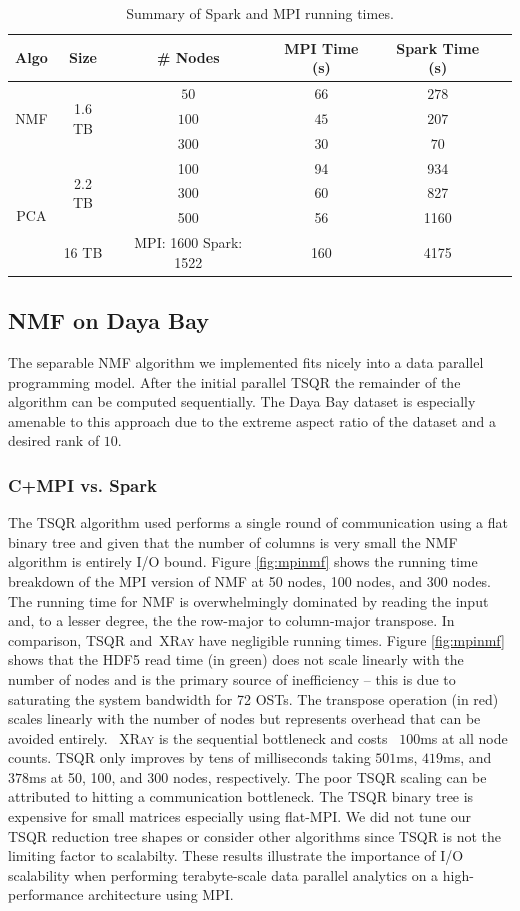 \begin{table}[t]
\centering

\begin{tabular}{|c|c|c|c|c|c|} \hline
Algo & Size & \# Nodes & MPI Time (s) & Spark Time (s)\\ \hline
\multirow{3}{*}{NMF} & \multirow{3}{*}{1.6 TB} & $50$ & $66$ & $278$\\
{} & {} & $100$  & $45$ & $207$\\
{} & {} & $300$ & $30$ & $70$\\ \hline
\multirow{4}{*}{PCA} & \multirow{3}{*}{2.2 TB} & 100 & 94 & 934\\
 {} & {} & 300 & 60 & 827\\
 {} & {} & 500 & 56 & 1160\\ \cline{2-5}
 {} & {16 TB} & {MPI: 1600 Spark: 1522} & 160 & 4175 \\ \hline
\end{tabular}
\caption{{Summary of Spark and MPI running times.}}
\label{tab:matrix}
\end{table}

\subsection{NMF on Daya Bay}
The separable NMF algorithm we implemented fits nicely into a data parallel programming model. After the initial parallel TSQR the remainder of the algorithm can be computed sequentially. The Daya Bay dataset is especially amenable to this approach due to the extreme aspect ratio of the dataset and a desired rank of $10$.
\subsubsection{C+MPI vs. Spark}
The TSQR algorithm used performs a single round of communication using a flat binary tree and given that the number of columns is very small the NMF algorithm is entirely I/O bound. Figure \ref{fig:mpinmf} shows the running time breakdown of the MPI version of NMF at 50 nodes, 100 nodes, and 300 nodes. The running time for NMF is overwhelmingly dominated by reading the input and, to a lesser degree, the the row-major to column-major transpose. In comparison, TSQR and~\textsc{XRay} have negligible running times. Figure \ref{fig:mpinmf} shows that the HDF5 read time (in green) does not scale linearly with the number of nodes and is the primary source of inefficiency -- this is due to saturating the system bandwidth for 72 OSTs. The transpose operation (in red) scales linearly with the number of nodes but represents overhead that can be avoided entirely. ~\textsc{XRay} is the sequential bottleneck and costs ~$100$ms at all node counts. TSQR only improves by tens of milliseconds taking $501$ms, $419$ms, and $378$ms at 50, 100, and 300 nodes, respectively. The poor TSQR scaling can be attributed to hitting a communication bottleneck. The TSQR  binary tree is expensive for small matrices especially using flat-MPI. We did not tune our TSQR reduction tree shapes or consider other algorithms since TSQR is not the limiting factor to scalabilty. These results illustrate the importance of I/O scalability when performing terabyte-scale data parallel analytics on a high-performance architecture using MPI.

